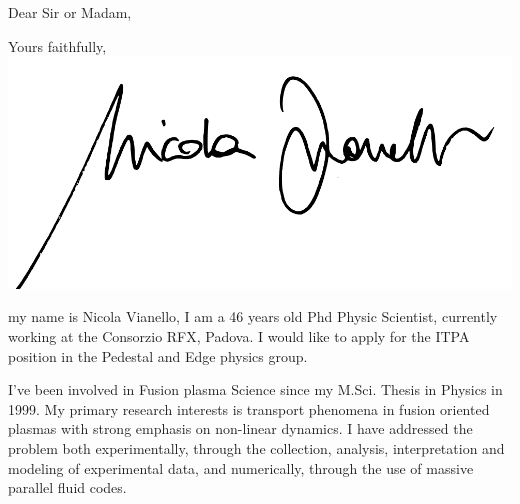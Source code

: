\documentclass[12pt,a4paper,sans]{moderncv}        %
\begin{document}
\date{November 05, 2019}
\opening{Dear Sir or Madam,}
\closing{Yours faithfully, \\
  \vspace{2pt}
  \includegraphics[height=4\baselineskip]{signature.pdf}}
\makelettertitle
my name is Nicola Vianello, I am a 46 years old Phd Physic Scientist,
currently working at the Consorzio RFX, Padova. I would like to apply for
the ITPA position in the Pedestal and Edge physics group. 

I've been involved in Fusion plasma Science since my M.Sci. Thesis in
Physics in 1999. My primary research interests is transport phenomena in fusion
oriented plasmas with strong emphasis on non-linear dynamics. I have
addressed the problem both experimentally, through the collection, 
analysis, interpretation and modeling of experimental data, and
numerically, through the use of massive parallel fluid codes. 
\end{document}
